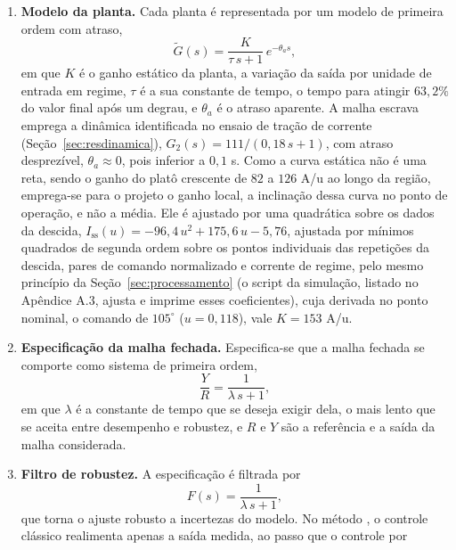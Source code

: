 \begin{enumerate}
    \item \textbf{Modelo da planta.} Cada planta é representada por um modelo de primeira
    ordem com atraso,
    \begin{equation}\label{eq:modelo_fopdt}
    \tilde{G}(s) = \frac{K}{\tau\,s + 1}\,e^{-\theta_a s},
    \end{equation}
    em que $K$ é o ganho estático da planta, a variação da saída por unidade de entrada em
    regime, $\tau$ é a sua constante de tempo, o tempo para atingir $63{,}2\%$ do valor
    final após um degrau, e $\theta_a$ é o atraso aparente. A malha escrava emprega a
    dinâmica identificada no ensaio de tração de corrente
    (Seção~\ref{sec:resdinamica}), $G_2(s) = 111/(0{,}18\,s + 1)$, com atraso
    desprezível, $\theta_a \approx 0$, pois inferior a $0{,}1$ s. Como a curva estática
    não é uma reta, sendo o ganho do platô crescente de $82$ a $126$ A/u ao longo da
    região, emprega-se para o projeto o ganho local, a inclinação dessa curva no ponto de
    operação, e não a média. Ele é ajustado por uma quadrática sobre os dados da descida,
    $I_{\mathrm{ss}}(u) = -96{,}4\,u^2 + 175{,}6\,u - 5{,}76$, ajustada por mínimos
    quadrados de segunda ordem sobre os pontos individuais das repetições da descida,
    pares de comando normalizado e corrente de regime, pelo mesmo princípio da
    Seção~\ref{sec:processamento} (o script da simulação, listado no Apêndice A.3, ajusta
    e imprime esses coeficientes), cuja derivada no ponto
    nominal, o comando de $105^\circ$ ($u = 0{,}118$), vale $K = 153$ A/u.
    \item \textbf{Especificação da malha fechada.} Especifica-se que a malha fechada se
    comporte como sistema de primeira ordem,
    \begin{equation}\label{eq:especificacao_malha}
    \frac{Y}{R} = \frac{1}{\lambda\,s + 1},
    \end{equation}
    em que $\lambda$ é a constante de tempo que se deseja exigir dela, o mais lento que se
    aceita entre desempenho e robustez, e $R$ e $Y$ são a referência e a saída da malha
    considerada.
    \item \textbf{Filtro de robustez.} A especificação é filtrada por
    \begin{equation}\label{eq:filtro_f}
    F(s) = \frac{1}{\lambda\,s + 1},
    \end{equation}
    que torna o ajuste robusto a incertezas do modelo. No método \cite{raffo_tcpi_imc}, o
    controle clássico realimenta apenas a saída medida, ao passo que o controle por

\end{enumerate}
